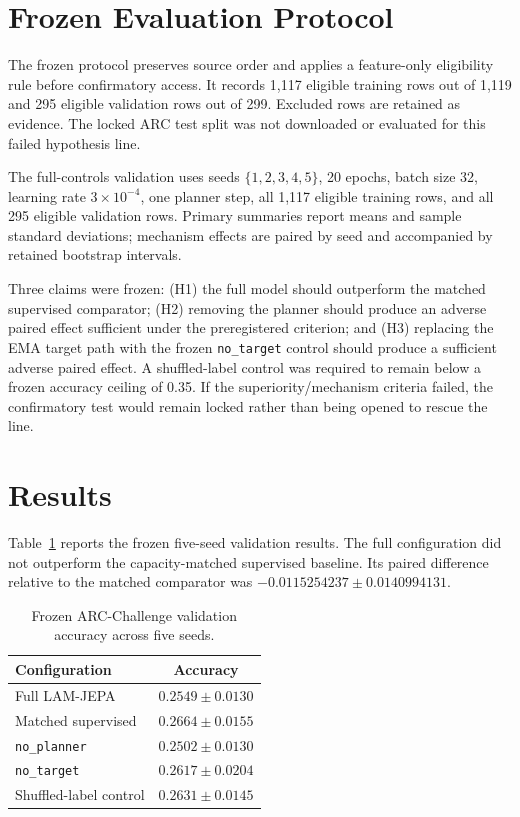 \documentclass[conference]{IEEEtran}
\begin{document}
\section{Frozen Evaluation Protocol}
The frozen protocol preserves source order and applies a feature-only eligibility rule before confirmatory access. It records 1,117 eligible training rows out of 1,119 and 295 eligible validation rows out of 299. Excluded rows are retained as evidence. The locked ARC test split was not downloaded or evaluated for this failed hypothesis line.

The full-controls validation uses seeds $\{1,2,3,4,5\}$, 20 epochs, batch size 32, learning rate $3\times10^{-4}$, one planner step, all 1,117 eligible training rows, and all 295 eligible validation rows. Primary summaries report means and sample standard deviations; mechanism effects are paired by seed and accompanied by retained bootstrap intervals.

Three claims were frozen: (H1) the full model should outperform the matched supervised comparator; (H2) removing the planner should produce an adverse paired effect sufficient under the preregistered criterion; and (H3) replacing the EMA target path with the frozen \texttt{no\_target} control should produce a sufficient adverse paired effect. A shuffled-label control was required to remain below a frozen accuracy ceiling of 0.35. If the superiority/mechanism criteria failed, the confirmatory test would remain locked rather than being opened to rescue the line.

\section{Results}
Table~\ref{tab:main} reports the frozen five-seed validation results. The full configuration did not outperform the capacity-matched supervised baseline. Its paired difference relative to the matched comparator was $-0.0115254237\pm0.0140994131$.

\begin{table}[t]
\centering
\caption{Frozen ARC-Challenge validation accuracy across five seeds.}
\label{tab:main}
\begin{tabular}{lc}
\toprule
Configuration & Accuracy \\
\midrule
Full LAM-JEPA & $0.2549\pm0.0130$ \\
Matched supervised & $0.2664\pm0.0155$ \\
\texttt{no\_planner} & $0.2502\pm0.0130$ \\
\texttt{no\_target} & $0.2617\pm0.0204$ \\
Shuffled-label control & $0.2631\pm0.0145$ \\
\bottomrule
\end{tabular}
\end{table}
\end{document}
